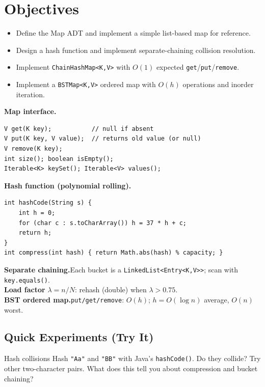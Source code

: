 \documentclass[11pt]{article}
\begin{document}
\labheader

\section*{Objectives}
\begin{itemize}[leftmargin=*,nosep]
  \item Define the Map ADT and implement a simple list-based map for reference.
  \item Design a hash function and implement separate-chaining collision resolution.
  \item Implement \texttt{ChainHashMap<K,V>} with $O(1)$ expected \texttt{get}/\texttt{put}/\texttt{remove}.
  \item Implement a \texttt{BSTMap<K,V>} ordered map with $O(h)$ operations and inorder iteration.
\end{itemize}

\begin{summary}
\textbf{Map interface.}
\begin{lstlisting}
V get(K key);           // null if absent
V put(K key, V value);  // returns old value (or null)
V remove(K key);
int size(); boolean isEmpty();
Iterable<K> keySet(); Iterable<V> values();
\end{lstlisting}

\textbf{Hash function (polynomial rolling).}
\begin{lstlisting}
int hashCode(String s) {
    int h = 0;
    for (char c : s.toCharArray()) h = 37 * h + c;
    return h;
}
int compress(int hash) { return Math.abs(hash) % capacity; }
\end{lstlisting}

\textbf{Separate chaining.}\quad Each bucket is a \texttt{LinkedList<Entry<K,V>>}; scan with \texttt{key.equals()}.\\
\textbf{Load factor} $\lambda = n/N$: rehash (double) when $\lambda > 0.75$.\\
\textbf{BST ordered map.}\quad \texttt{put/get/remove}: $O(h)$; $h = O(\log n)$ average, $O(n)$ worst.
\end{summary}

\subsection*{Quick Experiments (Try It)}

\begin{tryit}{Hash collisions}
Hash \texttt{"Aa"} and \texttt{"BB"} with Java's \texttt{hashCode()}.
Do they collide? Try other two-character pairs.
What does this tell you about compression and bucket chaining?
\end{tryit}
\end{document}
